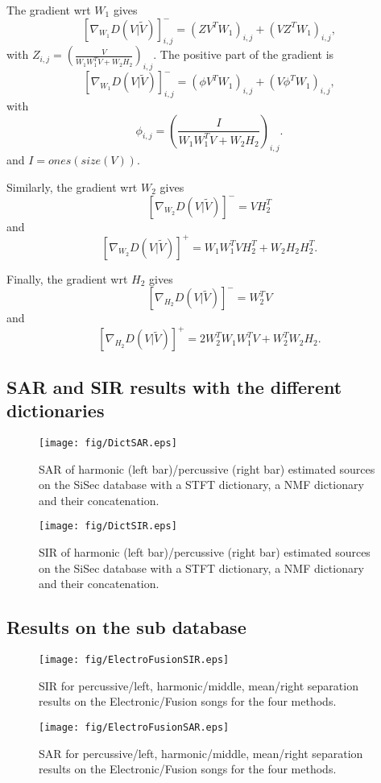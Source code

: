 The gradient wrt $W_1$ gives
$$[\nabla_{W_1} D(V|\tilde{V})]_{i,j}^{-} = (ZV^TW_1)_{i,j} + (VZ^TW_1)_{i,j},$$
with $Z_{i,j} = (\frac{V}{W_1W_1^TV + W_2H_2})_{i,j}$. 
The positive part of the gradient is
$$[\nabla_{W_1} D(V|\tilde{V})]_{i,j}^{-} = (\phi V^TW_1)_{i,j} + (V \phi^T W_1)_{i,j},$$
with $$ \phi_{i,j} = (\frac{I}{W_1W_1^TV + W_2H_2})_{i,j}.$$ and $I = ones(size(V))$.


Similarly, the gradient wrt $W_2$ gives
$$ [\nabla_{W_2} D(V|\tilde{V})]^{-} = VH_2^T $$
and
$$ [\nabla_{W_2} D(V|\tilde{V})]^{+} = W_1W_1^TVH_2^T + W_2H_2H_2^T.$$

Finally, the gradient wrt $H_2$ gives
$$ [\nabla_{H_2} D(V|\tilde{V})]^{-} = W_2^TV  $$
and
$$ [\nabla_{H_2} D(V|\tilde{V})]^{+} = 2W_2^TW_1W_1^TV + W_2^TW_2H_2. $$



\subsection{SAR and SIR results with the different dictionaries}
\label{appendix:dict}

\begin{figure}[H]
  \centering 
  \texttt{[image: fig/DictSAR.eps]}
  \caption{\label{resultsDictSAR} SAR of harmonic (left bar)/percussive (right bar) estimated sources on the SiSec database with a STFT dictionary, a NMF dictionary and their concatenation.}
\end{figure}

\begin{figure}[H]
  \centering 
  \texttt{[image: fig/DictSIR.eps]}
  \caption{\label{resultsDictSIR} SIR of harmonic (left bar)/percussive (right bar) estimated sources on the SiSec database with a STFT dictionary, a NMF dictionary and their concatenation.}
\end{figure}

\subsection{Results on the sub database}
\label{appendix:sub_database}

\begin{figure}[H]
  \centering 
  \texttt{[image: fig/ElectroFusionSIR.eps]}
  \caption{\label{ElectroFusionSIR} SIR for percussive/left, harmonic/middle, mean/right separation results on the Electronic/Fusion songs for the four methods.} 
\end{figure}

\begin{figure}[H]
  \centering 
  \texttt{[image: fig/ElectroFusionSAR.eps]}
  \caption{\label{ElectroFusionSAR} SAR for percussive/left, harmonic/middle, mean/right separation results on the Electronic/Fusion songs for the four methods.}
\end{figure}
